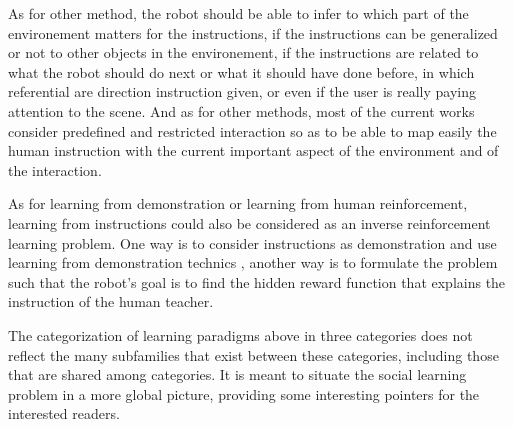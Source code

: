 As for other method, the robot should be able to infer to which part of the environement matters for the instructions, if the instructions can be generalized or not to other objects in the environement, if the instructions are related to what the robot should do next or what it should have done before, in which referential are direction instruction given, or even if the user is really paying attention to the scene. And as for other methods, most of the current works consider predefined and restricted interaction so as to be able to map easily the human instruction with the current important aspect of the environment and of the interaction.

As for learning from demonstration or learning from human reinforcement, learning from instructions could also be considered as an inverse reinforcement learning problem. One way is to consider instructions as demonstration and use learning from demonstration technics , another way is to formulate the problem such that the robot's goal is to find the hidden reward function that explains the instruction of the human teacher.


\transition

The categorization of learning paradigms above in three categories does not reflect the many subfamilies that exist between these categories, including those that are shared among categories. It is meant to situate the social learning problem in a more global picture, providing some interesting pointers for the interested readers. 

